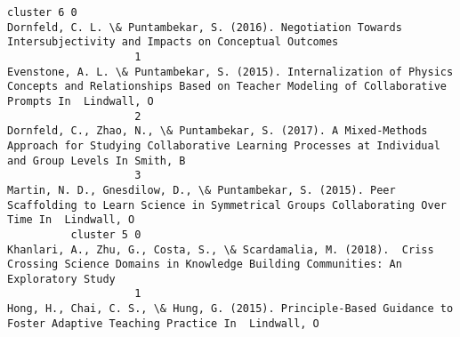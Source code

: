 \documentclass[journal,twocolumn]{IEEEtran}
\begin{document}
\begin{Verbatim}[commandchars=\\\{\}]
          cluster 6 0                                                                                                                                                                                                                                                                                                           Dornfeld, C. L. \& Puntambekar, S. (2016). Negotiation Towards Intersubjectivity and Impacts on Conceptual Outcomes 
                    1                                                                                                                                                                                                                                                           Evenstone, A. L. \& Puntambekar, S. (2015). Internalization of Physics Concepts and Relationships Based on Teacher Modeling of Collaborative Prompts In  Lindwall, O
                    2                                                                                                                                                                                                                                                           Dornfeld, C., Zhao, N., \& Puntambekar, S. (2017). A Mixed-Methods Approach for Studying Collaborative Learning Processes at Individual and Group Levels In Smith, B
                    3                                                                                                                                                                                                                                                                       Martin, N. D., Gnesdilow, D., \& Puntambekar, S. (2015). Peer Scaffolding to Learn Science in Symmetrical Groups Collaborating Over Time In  Lindwall, O
          cluster 5 0                                                                                                                                                                                                                                                                           Khanlari, A., Zhu, G., Costa, S., \& Scardamalia, M. (2018).  Criss Crossing Science Domains in Knowledge Building Communities: An Exploratory Study
                    1                                                                                                                                                                                                                                                                                                       Hong, H., Chai, C. S., \& Hung, G. (2015). Principle-Based Guidance to Foster Adaptive Teaching Practice In  Lindwall, O

\end{Verbatim}
\end{document}
